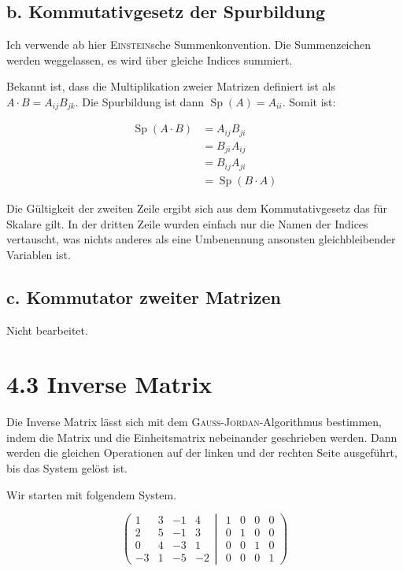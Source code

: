 \documentclass[a4paper,german,12pt,smallheadings]{scrartcl}
\begin{document}
\subsection*{b. Kommutativgesetz der Spurbildung}
Ich verwende ab hier \textsc{Einstein}sche Summenkonvention. Die Summenzeichen
werden weggelassen, es wird über gleiche Indices summiert.

Bekannt ist, dass die Multiplikation zweier Matrizen definiert ist als $A \cdot
B = A_{ij} B_{jk}$. Die Spurbildung ist dann $\operatorname{Sp}(A) = A_{ii}$.
Somit ist:

\begin{align*}
\operatorname{Sp}(A \cdot B) &=  A_{ij} B_{ji} \\
&= B_{ji} A_{ij} \\
&= B_{ij} A_{ji} \\
&= \operatorname{Sp}(B \cdot A)
\end{align*}

Die Gültigkeit der zweiten Zeile ergibt sich aus dem Kommutativgesetz das für
Skalare gilt. In der dritten Zeile wurden einfach nur die Namen der Indices
vertauscht, was nichts anderes als eine Umbenennung ansonsten gleichbleibender
Variablen ist.

\subsection*{c. Kommutator zweiter Matrizen}

Nicht bearbeitet.



\section*{4.3 Inverse Matrix}

Die Inverse Matrix lässt sich mit dem \textsc{Gauß}-\textsc{Jordan}-Algorithmus
bestimmen, indem die Matrix und die Einheitsmatrix nebeinander geschrieben
werden. Dann werden die gleichen Operationen auf der linken und der rechten
Seite ausgeführt, bis das System gelöst ist.

Wir starten mit folgendem System.

\begin{equation*}
\left(
 \begin{matrix}
 1 & 3 & -1 & 4 \\
 2 & 5 & -1 & 3 \\
 0 & 4 & -3 & 1 \\
 -3 & 1 & -5 & -2
 \end{matrix}
 \left|
  \hspace{5pt}
  \begin{matrix}
  1 & 0 & 0 & 0 \\
  0 & 1 & 0 & 0 \\
  0 & 0 & 1 & 0 \\
  0 & 0 & 0 & 1
  \end{matrix}
 \right)
\right.
\end{equation*}
\end{document}
